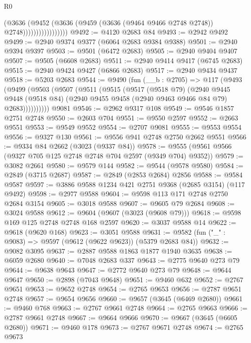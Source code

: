 \begin{lexlean}{R0}
\begin{coremodule}
                              (@3636
                                (@9452
                                  (@3636
                                    (@9459 (@3636 (@9464 @9466 @2748 @2748)) @2748)))))))))))))))))
@9492 := @4120 @2683 @84
@9493 := @2942 @9492
@9499 := @2940 @9374 @9377 (@6064 @2683 @9384 @9388)
@9501 := @2940 @9394 @9397
@9503 := @9501 (@6472 @2683)
@9505 := @2940 @9404 @9407
@9507 := @9505 (@6608 @2683)
@9511 := @2940 @9414 @9417 (@6745 @2683)
@9515 := @2940 @9424 @9427 (@6866 @2683)
@9517 := @2940 @9434 @9437
@9518 := @5203 @2683
@9544 := @9490
    (fun (__b : @2705) =>
    @117
      (@9493
        (@9499
          (@9503
            (@9507
              (@9511
                (@9515
                  (@9517
                    (@9518 @79)
                    (@2940
                      @9445
                      @9448
                      (@9518 @84)
                      (@2940 @9455 @9458 (@2940 @9463 @9466 @84 @79) @2683))))))))))
    @9081
@9546 := @2962 @9317 @108
@9549 := @9546 @1857 @2751 @2748
@9550 := @2603 @704
@9551 := @9550 @2597
@9552 := @2663 @9551
@9553 := @9549 @9552
@9554 := @2707 @9081
@9555 := @9553 @9554
@9556 := @9327 @130
@9561 := @9556 @941 @2748 @2750 @2662 @9551
@9566 := @9334 @84 @2662 (@3023 (@9337 @84))
@9578 := @9555 (@9561 @9566 (@9327 @705 @125 @2748 @2748 @704 @2597 (@9349 @704) @9352))
@9579 := @3082 @2661
@9580 := @9579 @144
@9582 := @9544 (@9578 @9580)
@9584 := @2849 (@3715 @2687)
@9587 := @2849 (@2853 @2684) @2856
@9588 := @9584 @9587
@9597 := @3886 @9588 @1234 @421 @2751 @9368 (@2685 @3154) (@117 @9492)
@9598 := @2977 @9588
@9604 := @9598 @113 @171 @2748 @2750 @2684 @3154
@9605 := @3018 @9588
@9607 := @9605 @79 @2684
@9608 := @3024 @9588
@9612 := @9604 (@9607 (@3023 (@9608 @79)))
@9618 := @9598 @169 @125 @2748 @2748 @168 @2597
@9620 := @3037 @9588 @14
@9622 := @9618 (@9620 @168)
@9623 := @3051 @9588
@9631 := @9582 (fun ("_" : @9083) => @9597 (@9612 (@9622 @9623)) (@5379 @2683 @84))
@9632 := @9082 @3095
@9637 := @2887 @9588 @1863 @1877 @1940 @3635
@9638 := @6059 @2680
@9640 := @7048 @2683 @337
@9643 := @2775 @9640 @273 @79
@9644 := @9638 @9643
@9647 := @2772 @9640 @273 @79
@9648 := @9644 @9647
@9650 := @2898 (@7043 @9648)
@9651 := @9460 @632
@9652 := @2767 @9651
@9653 := @9652 @2748
@9654 := @2765 @9653
@9656 := @2787 @9651 @2748
@9657 := @9654 @9656
@9660 := @9657 (@3645 (@6469 @2680))
@9661 := @9460 @768
@9663 := @2767 @9661 @2748
@9664 := @2765 @9663
@9666 := @2787 @9661 @2748
@9667 := @9664 @9666
@9670 := @9667 (@3645 (@6605 @2680))
@9671 := @9460 @178
@9673 := @2767 @9671 @2748
@9674 := @2765 @9673

\end{coremodule}
\end{lexlean}
